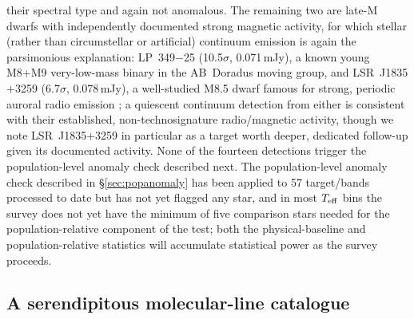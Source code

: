 \documentclass{openjournal}
\begin{document}
their spectral type and again not anomalous. The remaining two are
late-M dwarfs with independently documented
strong magnetic activity, for which stellar (rather than circumstellar or
artificial) continuum emission is again the parsimonious explanation:
LP~349$-$25 (10.5$\sigma$, 0.071\,mJy), a known young M8+M9 very-low-mass
binary in the AB~Doradus moving group, and LSR~J1835$+$3259
(6.7$\sigma$, 0.078\,mJy), a well-studied M8.5 dwarf famous for strong,
periodic auroral radio emission \citep{Hallinan2007}; a quiescent
continuum detection from either is consistent with their established,
non-technosignature radio/magnetic activity, though we note LSR~J1835$+$3259
in particular as a target worth deeper, dedicated follow-up given its
documented activity. None of the fourteen
detections trigger the population-level anomaly check described next.
The population-level anomaly check described in
\S\ref{sec:popanomaly} has been applied to 57 target/bands processed to
date but has not yet flagged any star, and in most $T_{\rm eff}$ bins the
survey does not yet have the minimum of five comparison stars needed for
the population-relative component of the test; both the physical-baseline
and population-relative statistics will accumulate statistical power as
the survey proceeds.

\subsection{A serendipitous molecular-line catalogue}
\label{sec:linecatalogue}
\end{document}
